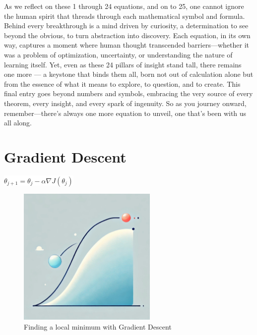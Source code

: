\documentclass[
  12 pt,
  a4paper,
]{book}
\numberwithin{equation}{section}
\theoremstyle{plain}      %
\theoremstyle{definition} %
\theoremstyle{remark}     %
\theoremstyle{note}         %
\begin{document}
As we reflect on these 1 through 24 equations, and on to 25, one cannot
ignore the human spirit that threads through each mathematical symbol
and formula. Behind every breakthrough is a mind driven by curiosity, a
determination to see beyond the obvious, to turn abstraction into
discovery. Each equation, in its own way, captures a moment where human
thought transcended barriers---whether it was a problem of optimization,
uncertainty, or understanding the nature of learning itself. Yet, even
as these 24 pillars of insight stand tall, there remains one more --- a
keystone that binds them all, born not out of calculation alone but from
the essence of what it means to explore, to question, and to create.
This final entry goes beyond numbers and symbols, embracing the very
source of every theorem, every insight, and every spark of ingenuity. So
as you journey onward, remember---there's always one more equation to
unveil, one that's been with us all along.

\mainmatter

\renewcommand{\chaptername}{Equation}

\hypertarget{gradient-descent}{%
\chapter{Gradient Descent}\label{gradient-descent}}

\begin{center}
\colorbox{white}{\color{navyimpactblue} \huge $\theta_{j+1} = \theta_j - \alpha \nabla J(\theta_j)$}
\end{center}

\hfill\break

\begin{figure}[h!]
  \begin{center}
    \includegraphics[width=0.6\textwidth]{pictures/Whimsical-1-gradient_descent.jpeg}
    \caption*{\Large Finding a local minimum with Gradient Descent}
  \end{center}
\end{figure}
\end{document}
